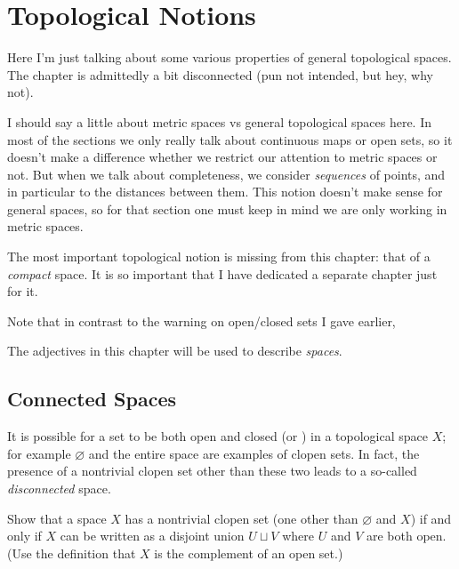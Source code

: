\chapter{Topological Notions}
\label{ch:top_more}
Here I'm just talking about some various properties of general topological spaces.
The chapter is admittedly a bit disconnected (pun not intended, but hey, why not).

I should say a little about metric spaces vs general topological spaces here.
In most of the sections we only really talk about continuous maps or open sets,
so it doesn't make a difference whether we restrict our attention to metric spaces or not.
But when we talk about completeness, we consider \emph{sequences} of points,
and in particular to the distances between them.
This notion doesn't make sense for general spaces, so for that section one must
keep in mind we are only working in metric spaces.

The most important topological notion is missing from this chapter:
that of a \emph{compact} space.
It is so important that I have dedicated a separate chapter just for it.

Note that in contrast to the warning on open/closed sets I gave earlier,
\begin{moral}
	The adjectives in this chapter will be used to describe \emph{spaces}.
\end{moral}


\section{Connected Spaces}
It is possible for a set to be both open and closed (or ) in a
topological space $X$;
for example $\varnothing$ and the entire space are examples of clopen sets.
In fact, the presence of a nontrivial clopen set other than these two leads
to a so-called \emph{disconnected} space.

\begin{ques}
	Show that a space $X$ has a nontrivial clopen set
	(one other than $\varnothing$ and $X$)
	if and only if $X$ can be written as a disjoint union $U \sqcup V$
	where $U$ and $V$ are both open.
	(Use the definition that $X$ is the complement of an open set.)
\end{ques}

